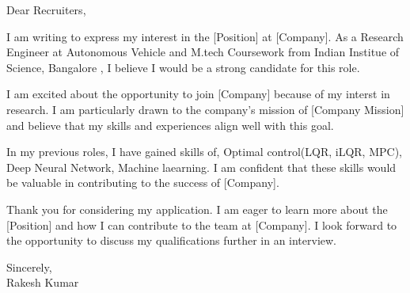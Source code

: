 \documentclass{letter}
\begin{document}
\begin{letter}{%
}
\opening{Dear Recruiters,}


I am writing to express my interest in the [Position] at [Company]. As a Research Engineer at Autonomous Vehicle and M.tech Coursework from Indian Institue of Science, Bangalore ,
I believe I would be a strong candidate for this role.


I am excited about the opportunity to join [Company] because of my interst in research. I am particularly drawn to the company's mission of [Company Mission] and believe that my skills and experiences align well with this goal.


In my previous roles, I have gained skills of, Optimal control(LQR, iLQR, MPC), Deep Neural Network, Machine laearning. I am confident that these skills would be valuable in contributing to the success of [Company].


Thank you for considering my application. I am eager to learn more about the [Position] and how I can contribute to the team at [Company]. I look forward to the opportunity to discuss my qualifications further in an interview.

Sincerely,\\
Rakesh Kumar

\end{letter}
\end{document}
